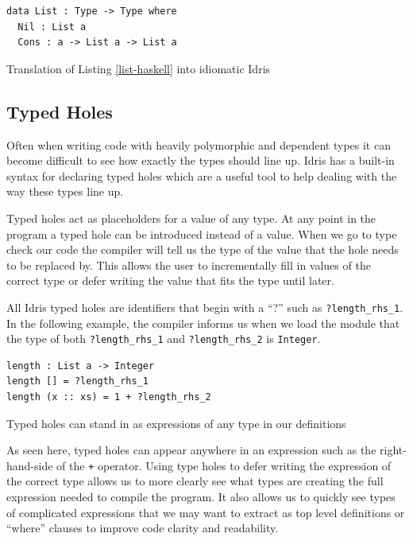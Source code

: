 \documentclass[a4paper, notitlepage]{report}
\begin{document}
\begin{listing}[H]
\begin{verbatim}
data List : Type -> Type where
  Nil : List a
  Cons : a -> List a -> List a
\end{verbatim}
\caption{Translation of Listing \ref{list-haskell} into idiomatic Idris}
\end{listing}

\subsection{Typed Holes}
\label{sec:org2532e71}
Often when writing code with heavily polymorphic and dependent types it can
become difficult to see how exactly the types should line up. Idris has a
built-in syntax for declaring typed holes which are a useful tool to help
dealing with the way these types line up.

Typed holes act as placeholders for a value of any type. At any point in the
program a typed hole can be introduced instead of a value. When we go to type
check our code the compiler will tell us the type of the value that the hole
needs to be replaced by. This allows the user to incrementally fill in values of
the correct type or defer writing the value that fits the type until later.

All Idris typed holes are identifiers that begin with a ``?'' such as
\texttt{?length\_rhs\_1}. In the following example, the compiler informs us when we load
the module that the type of both \texttt{?length\_rhs\_1} and \texttt{?length\_rhs\_2} is \texttt{Integer}.

\begin{listing}[H]
\begin{verbatim}
length : List a -> Integer
length [] = ?length_rhs_1
length (x :: xs) = 1 + ?length_rhs_2
\end{verbatim}
\caption{Typed holes can stand in as expressions of any type in our definitions}
\end{listing}

As seen here, typed holes can appear anywhere in an expression such as the
right-hand-side of the \texttt{+} operator. Using type holes to defer writing the
expression of the correct type allows us to more clearly see what types are
creating the full expression needed to compile the program. It also allows us to
quickly see types of complicated expressions that we may want to extract as top
level definitions or ``where'' clauses to improve code clarity and readability.
\end{document}

